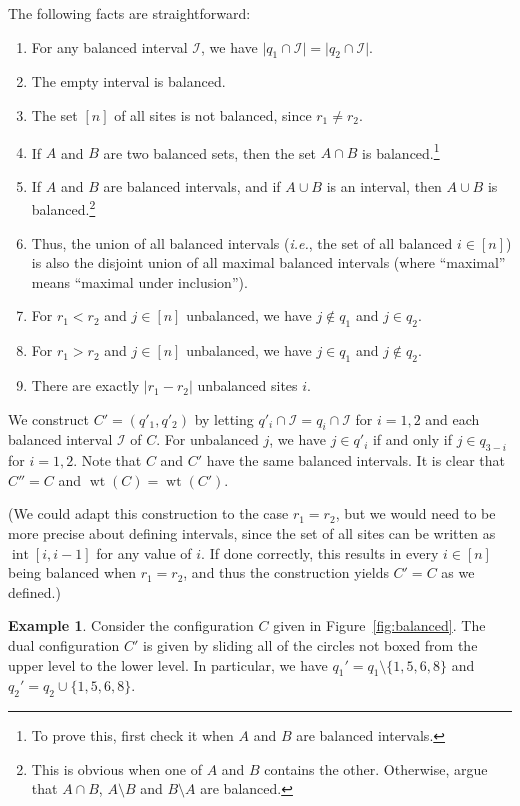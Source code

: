 \documentclass[reqno]{amsart}
\newcommand{\0}{\phantom{c}}
\DeclareMathOperator{\inter}{int} %
\DeclareMathOperator{\wt}{wt} %
\newcommand{\mcI}{\mathcal{I}}
\newenvironment{verlong}{}{}
\newcommand{\abs}[1]{\left| #1 \right|}
\newcommand{\ive}[1]{\left[ #1 \right]}
\theoremstyle{plain}
\theoremstyle{definition}
\newtheorem{example}[thm]{Example}
\numberwithin{equation}{section}
\begin{document}
\begin{verlong}
The following facts are straightforward:
\begin{enumerate}
 \item For any balanced interval $\mcI$, we have $\lvert q_1 \cap \mcI \rvert = \lvert q_2 \cap \mcI \rvert$.
 \item The empty interval is balanced.
 \item The set $\ive{n}$ of all sites is not balanced, since $r_1 \neq r_2$.
 \item If $A$ and $B$ are two balanced sets, then the set $A \cap B$
       is balanced.\footnote{To prove this, first check it when $A$ and $B$
       are balanced intervals.}
 \item If $A$ and $B$ are balanced intervals, and if $A \cup B$ is an
       interval, then $A \cup B$ is balanced.\footnote{This is obvious
       when one of $A$ and $B$ contains the other. Otherwise, argue
       that $A \cap B$, $A \setminus B$ and $B \setminus A$ are balanced.}
 \item Thus, the union of all balanced intervals (\textit{i.e.}, the set of all balanced
       $i \in \ive{n}$) is also the disjoint union of all maximal balanced intervals
       (where ``maximal'' means ``maximal under inclusion'').
 \item For $r_1 < r_2$ and $j \in \ive{n}$ unbalanced, we have $j \notin q_1$ and $j \in q_2$.
 \item For $r_1 > r_2$ and $j \in \ive{n}$ unbalanced, we have $j \in q_1$ and $j \notin q_2$.
 \item There are exactly $\abs{r_1 - r_2}$ unbalanced sites $i$.
\end{enumerate}

We construct $C' = (q'_1, q'_2)$ by letting $q'_i \cap \mcI = q_i \cap \mcI$ for $i=1,2$ and each balanced interval $\mcI$ of $C$.
For unbalanced $j$, we have $j \in q'_i$ if and only if $j \in q_{3-i}$ for $i = 1,2$.
Note that $C$ and $C'$ have the same balanced intervals.
It is clear that $C'' = C$ and $\wt(C) = \wt(C')$.

(We could adapt this construction to the case $r_1 = r_2$, but we would need to be more precise about defining intervals, since the set of all sites can be written as $\inter[i, i-1]$ for any value of $i$. If done correctly, this results in every $i \in \ive{n}$ being balanced when $r_1 = r_2$, and thus the construction yields $C' = C$ as we defined.)

\begin{example}
Consider the configuration $C$ given in Figure~\ref{fig:balanced}.
The dual configuration $C'$ is given by sliding all of the circles not boxed from the upper level to the lower level.
In particular, we have $q_1' = q_1 \setminus \{1,5,6,8\}$ and $q_2' = q_2 \cup \{1,5,6,8\}$.
\end{example}


\end{verlong}
\end{document}
